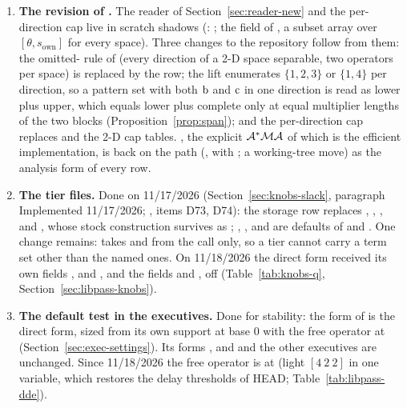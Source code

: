 \begingroup\setlength{\emergencystretch}{8em}
\begin{enumerate}\setlength\itemsep{0pt}
\item \textbf{The revision of .} The reader of Section~\ref{sec:reader-new} and the per-direction cap live in scratch shadows (: ; the  field of , a subset array over $[\theta,s_{\mathrm{own}}]$ for every space). Three changes to the repository follow from them: the omitted- rule of  (every direction of a 2-D space separable, two operators per space) is replaced by the row; the lift enumerates $\{1,2,3\}$ or $\{1,4\}$ per direction, so a pattern set with both $\mathrm{b}$ and $\mathrm{c}$ in one direction is read as lower plus upper, which equals lower plus complete only at equal multiplier lengths of the two blocks (Proposition~\ref{prop:span}); and the per-direction cap replaces  and the 2-D cap tables. , the explicit $\mathcal{A}^*\mathcal{M}\mathcal{A}$ of which  is the efficient implementation, is back on the path (, with ; a working-tree move) as the analysis form of every row.
\item \textbf{The tier files.} Done on 11/17/2026 (Section~\ref{sec:knobs-slack}, paragraph Implemented 11/17/2026; , items D73, D74): the storage row replaces , , ,  and , whose stock construction survives as ; , ,  and  are defaults of  and . One change remains:  takes  and  from the call only, so a tier cannot carry a term set other than the named ones. On 11/18/2026 the direct form received its own fields ,  and , and  the fields  and , off (Table~\ref{tab:knobs-q}, Section~\ref{sec:libpass-knobs}).
\item \textbf{The default test in the executives.} Done for stability: the  form of  is the direct form, sized from its own support at base $0$ with the free operator at  (Section~\ref{sec:exec-settings}). Its forms ,  and  and the other executives are unchanged. Since 11/18/2026 the free operator is at  (light $[4\ 2\ 2]$ in one variable, which restores the delay thresholds of HEAD; Table~\ref{tab:libpass-dde}).

\end{enumerate}
